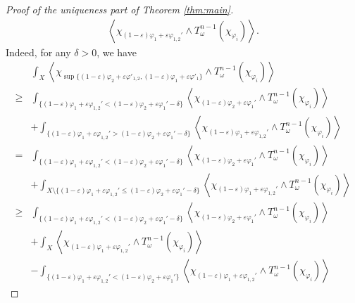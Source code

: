 \documentclass{amsart}
\numberwithin{equation}{section}
\theoremstyle{plain}
\theoremstyle{definition}
\theoremstyle{remark}
\begin{document}
\begin{proof}[Proof of the uniqueness part of Theorem \ref{thm:main}]
\begin{equation}
\begin{split}
        \left\langle\chi_{(1-\varepsilon)\varphi_1+\varepsilon\varphi_{1,2}'}\wedge T^{n-1}_\omega(\chi_{\varphi_i})\right\rangle.
    \end{split}
    \end{equation}
    Indeed, for any $\delta>0$, we have
    \begin{equation*}
        \begin{split}
            &\int_X \left\langle\chi_{\sup\{(1-\varepsilon)\varphi_2+\varepsilon\varphi'_{1,2},(1-\varepsilon)\varphi_1+\varepsilon\varphi'_1\}}\wedge T^{n-1}_\omega(\chi_{\varphi_i})\right\rangle\\
            \ge&\int_{\{(1-\varepsilon)\varphi_1+\varepsilon\varphi_{1,2}'<(1-\varepsilon)\varphi_2+\varepsilon\varphi_1'-\delta\}}\left\langle\chi_{(1-\varepsilon)\varphi_2+\varepsilon\varphi_1'}\wedge T^{n-1}_\omega(\chi_{\varphi_i})\right\rangle\\
            &+\int_{\{(1-\varepsilon)\varphi_1+\varepsilon\varphi_{1,2}'>(1-\varepsilon)\varphi_2+\varepsilon\varphi_1'-\delta\}}\left\langle\chi_{(1-\varepsilon)\varphi_1+\varepsilon\varphi_{1,2}'}\wedge T^{n-1}_\omega(\chi_{\varphi_i})\right\rangle\\
            =&\int_{\{(1-\varepsilon)\varphi_1+\varepsilon\varphi_{1,2}'<(1-\varepsilon)\varphi_2+\varepsilon\varphi_1'-\delta\}}\left\langle\chi_{(1-\varepsilon)\varphi_2+\varepsilon\varphi_1'}\wedge T^{n-1}_\omega(\chi_{\varphi_i})\right\rangle\\
            &+\int_{X\setminus{\{(1-\varepsilon)\varphi_1+\varepsilon\varphi_{1,2}'\le(1-\varepsilon)\varphi_2+\varepsilon\varphi_1'-\delta\}}}\left\langle\chi_{(1-\varepsilon)\varphi_1+\varepsilon\varphi_{1,2}'}\wedge T^{n-1}_\omega(\chi_{\varphi_i})\right\rangle\\
            \ge&\int_{\{(1-\varepsilon)\varphi_1+\varepsilon\varphi_{1,2}'<(1-\varepsilon)\varphi_2+\varepsilon\varphi_1'-\delta\}}\left\langle\chi_{(1-\varepsilon)\varphi_2+\varepsilon\varphi_1'}\wedge T^{n-1}_\omega(\chi_{\varphi_i})\right\rangle\\
            &+\int_X\left\langle\chi_{(1-\varepsilon)\varphi_1+\varepsilon\varphi_{1,2}'}\wedge T^{n-1}_\omega(\chi_{\varphi_i})\right\rangle\\
            &-\int_{\{(1-\varepsilon)\varphi_1+\varepsilon\varphi_{1,2}'<(1-\varepsilon)\varphi_2+\varepsilon\varphi_1'\}}\left\langle\chi_{(1-\varepsilon)\varphi_1+\varepsilon\varphi_{1,2}'}\wedge T^{n-1}_\omega(\chi_{\varphi_i})\right\rangle
        \end{split}

\end{equation*}
\end{proof}
\end{document}
